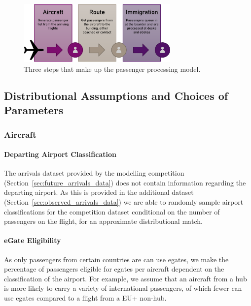 \documentclass[10pt]{article}
\begin{document}
\begin{figure}[!ht]
    \centering
    \includegraphics[width=0.7\textwidth]{figures/ThreeSteps.png}
     \caption{Three steps that make up the passenger processing model.  } \label{fig:PPM_threesteps}
\end{figure}

\subsection{Distributional Assumptions and Choices of Parameters}

\subsubsection{Aircraft}

\paragraph{Departing Airport Classification}
The arrivals dataset provided by the modelling competition (Section~\ref{sec:future_arrivals_data}) does not contain information regarding the departing airport. As this is provided in the additional dataset (Section~\ref{sec:observed_arrivals_data}) we are able to randomly sample airport classifications for the competition dataset conditional on the number of passengers on the flight, for an approximate distributional match. 

\paragraph{eGate Eligibility} 
As only passengers from certain countries are can use \glspl{egate}, we make the percentage of passengers eligible for \glspl{egate} per aircraft dependent on the classification of the airport. For example, we assume that an aircraft from a hub is more likely to carry a variety of international passengers, of which fewer can use \glspl{egate} compared to a flight from a EU+ non-hub. 
\end{document}
